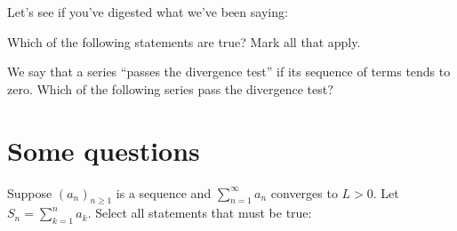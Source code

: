 \documentclass{ximera}
\begin{document}
Let's see if you've digested what we've been saying:

\begin{question}
Which of the following statements are true?  Mark all that apply.
\begin{selectAll}
\end{selectAll}
\end{question}


\begin{question}
  We say that a series ``passes the divergence test'' if its sequence
  of terms tends to zero.  Which of the following series pass the
  divergence test?
\begin{selectAll}
\end{selectAll}
\end{question}


\section{Some questions}

\begin{question}
  Suppose $(a_n)_{n \geq 1}$ is a sequence and $\sum^{\infty}_{n= 1}
  a_n$ converges to $L>0$.  Let $S_n = \sum^n_{k=1} a_k$. Select all
  statements that must be true:
  \begin{selectAll}
  \end{selectAll}
\end{question}
\end{document}

